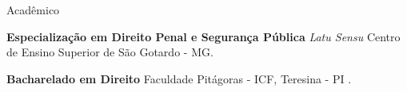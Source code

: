 \begin{rubric}{Acadêmico}

\entry*[2021 -- 2022]%
	\textbf{Especialização em Direito Penal e Segurança Pública} \textit{Latu Sensu} Centro de Ensino Superior de São Gotardo - MG.

\entry*[2017 -- 2021]%
	\textbf{Bacharelado em Direito} Faculdade Pitágoras - ICF, Teresina - PI .
\end{rubric}
